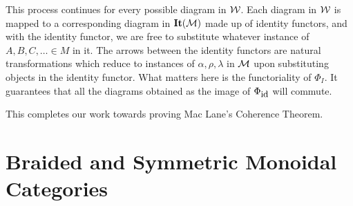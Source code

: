 \begin{center}
{
    }
\end{center}
This process continues for every possible diagram in $\mathcal{W}$. 
Each diagram in $\mathcal{W}$ is mapped to a corresponding diagram 
in $\textbf{It}(\mathcal{M})$ made up of identity functors, and 
with the identity functor, we are free to substitute whatever instance 
of $A, B, C, \dots \in M$ in it. The arrows between the identity functors 
are natural transformations which reduce to instances of $\alpha, \rho, \lambda$ in
$\mathcal{M}$ upon substituting objects in the identity functor. 
What matters here is the functoriality of $\Phi_I$.
It guarantees that all the diagrams obtained as the image of $\Phi_{\text{\small id}}$ 
will commute. 

This completes our work towards proving Mac Lane's Coherence Theorem.



\newpage
\section{Braided and Symmetric Monoidal Categories}

